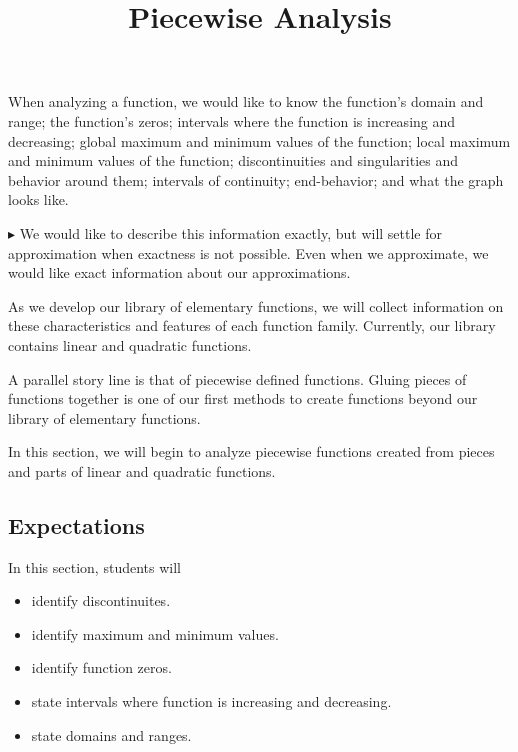 \documentclass{ximera}
\title{Piecewise Analysis}
\begin{document}
\begin{abstract}
\end{abstract}
\maketitle




When analyzing a function, we would like to know the function's domain and range; the function's zeros; intervals where the function is increasing and decreasing; global maximum and minimum values of the function; local maximum and minimum values of the function; discontinuities and singularities and behavior around them; intervals of continuity; end-behavior; and what the graph looks like.


$\blacktriangleright$ We would like to describe this information exactly, but will settle for approximation when exactness is not possible. Even when we approximate, we would like exact information about our approximations.


As we develop our library of elementary functions, we will collect information on these characteristics and features of each function family.  Currently, our library contains linear and quadratic functions.  

A parallel story line is that of piecewise defined functions.  Gluing pieces of functions together is one of our first methods to create functions beyond our library of elementary functions.

In this section, we will begin to analyze piecewise functions created from pieces and parts of linear and quadratic functions.
















\subsection{Expectations}


\begin{sectionOutcomes}
In this section, students will 

\begin{itemize}
\item identify discontinuites.
\item identify maximum and minimum values.
\item identify function zeros.
\item state intervals where function is increasing and decreasing.
\item state domains and ranges.
\end{itemize}
\end{sectionOutcomes}
\end{document}
